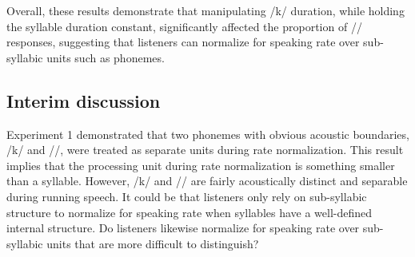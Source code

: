 \documentclass[preprint]{JASA}
\begin{document}


Overall, these results demonstrate that manipulating /k/ duration, while holding the syllable duration constant, significantly affected the proportion of /\textesh/ responses, suggesting that listeners can normalize for speaking rate over sub-syllabic units such as phonemes.

\subsection{Interim discussion}

Experiment 1 demonstrated that two phonemes with obvious acoustic boundaries, /k/ and /\textscripta/, were treated as separate units during rate normalization. This result implies that the processing unit during rate normalization is something smaller than a syllable. However, /k/ and /\textscripta/ are fairly acoustically distinct and separable during running speech. It could be that listeners only rely on sub-syllabic structure to normalize for speaking rate when syllables have a well-defined internal structure. Do listeners likewise normalize for speaking rate over sub-syllabic units that are more difficult to distinguish? 
\end{document}
